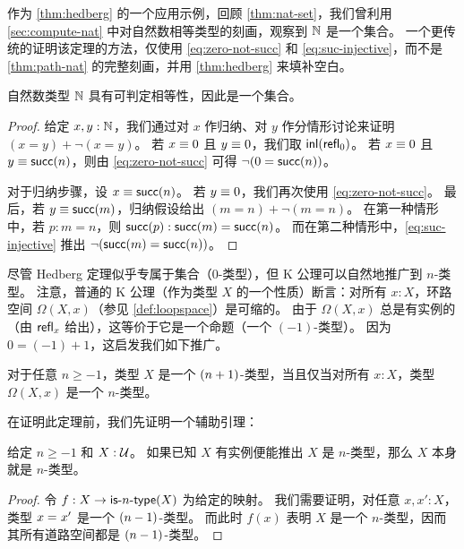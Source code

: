 %

作为 \cref{thm:hedberg} 的一个应用示例，回顾 \cref{thm:nat-set}，我们曾利用 \cref{sec:compute-nat} 中对自然数相等类型的刻画，观察到 $\mathbb{N}$ 是一个集合。
一个更传统的证明该定理的方法，仅使用 \eqref{eq:zero-not-succ} 和 \eqref{eq:suc-injective}，而不是 \cref{thm:path-nat} 的完整刻画，并用 \cref{thm:hedberg} 来填补空白。

\begin{thm}\label{prop:nat-is-set}
 自然数类型 $\mathbb{N}$ 具有可判定相等性，因此是一个集合。
\end{thm}

\begin{proof}
  给定 $x, y : \mathbb{N}$，我们通过对 $x$ 作归纳、对 $y$ 作分情形讨论来证明 $(x=y)+\neg(x=y)$。
  若 $x \equiv 0$ 且 $y \equiv 0$，我们取 ${\mathsf{inl}}(\mathsf{refl}_{0})$。
  若 $x \equiv 0$ 且 $y \equiv \mathsf{succ}(n)$，则由 \eqref{eq:zero-not-succ} 可得 $\neg (0 = \mathsf{succ} (n))$。

  对于归纳步骤，设 $x \equiv \mathsf{succ} (n)$。
  若 $y \equiv 0$，我们再次使用 \eqref{eq:zero-not-succ}。
  最后，若 $y \equiv \mathsf{succ} (m)$，归纳假设给出 $(m = n)+\neg(m = n)$。
  在第一种情形中，若 $p:m=n$，则 ${\mathsf{succ}}\mathopen{}\left({p}\right)\mathclose{}:\mathsf{succ}(m)=\mathsf{succ}(n)$。
  而在第二种情形中，\eqref{eq:suc-injective} 推出 $\neg(\mathsf{succ}(m)=\mathsf{succ}(n))$。
\end{proof}

%

%
尽管 Hedberg 定理似乎专属于集合（$0$-类型），但 K 公理可以自然地推广到 $n$-类型。
注意，普通的 K 公理（作为类型 $X$ 的一个性质）断言：对所有 $x:X$，环路空间 $\Omega(X,x)$（参见 \cref{def:loopspace}）是可缩的。
由于 $\Omega(X,x)$ 总是有实例的（由 $\mathsf{refl}_{x}$ 给出），这等价于它是一个命题（一个 $(-1)$-类型）。
因为 $0 = (-1)+1$，这启发我们如下推广。

\begin{thm}\label{thm:hlevel-loops}
  对于任意 $n\geq -1$，类型 $X$ 是一个 $(n+1)$-类型，当且仅当对所有 $x : X$，类型 $\Omega(X, x)$ 是一个 $n$-类型。
\end{thm}

在证明此定理前，我们先证明一个辅助引理：

\begin{lem}\label{lem:hlevel-if-inhab-hlevel}
  给定 $n \geq -1$ 和 $X : \mathcal{U}$。
  如果已知 $X$ 有实例便能推出 $X$ 是 $n$-类型，那么 $X$ 本身就是 $n$-类型。
\end{lem}

\begin{proof}
  令 $f : X \to \mathsf{is}\mbox{-}{n}\mbox{-}\mathsf{type}(X)$ 为给定的映射。
  我们需要证明，对任意 $x, x' : X$，类型 $x =_{} x'$ 是一个 $(n-1)$-类型。
  而此时 $f(x)$ 表明 $X$ 是一个 $n$-类型，因而其所有道路空间都是 $(n-1)$-类型。
\end{proof}

